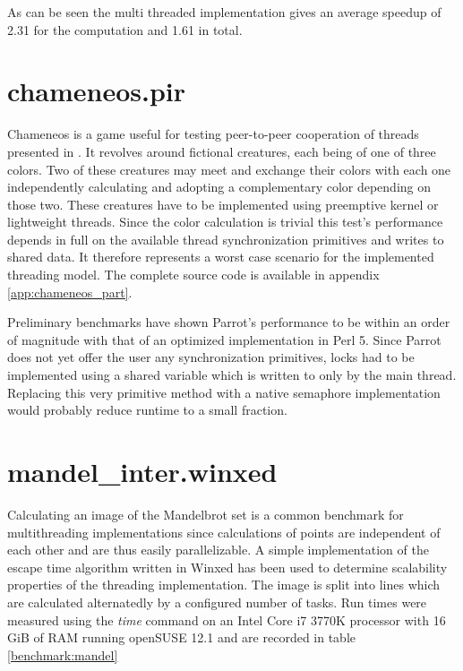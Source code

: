\documentclass[bachelor,english]{hgbthesis}
\begin{document}
As can be seen the multi threaded implementation gives an average speedup of 2.31 for the computation and 1.61 in total.

\section{chameneos.pir}

Chameneos is a game useful for testing peer-to-peer cooperation of threads presented in \cite{Chameneos}. It revolves around fictional creatures, each being of one of three colors. Two of these creatures may meet and exchange their colors with each one independently calculating and adopting a complementary color depending on those two. These creatures have to be implemented using preemptive kernel or lightweight threads. Since the color calculation is trivial this test's performance depends in full on the available thread synchronization primitives and writes to shared data. It therefore represents a worst case scenario for the implemented threading model. The complete source code is available in appendix \ref{app:chameneos_part}.

Preliminary benchmarks have shown Parrot's performance to be within an order of magnitude with that of an optimized implementation in Perl 5. Since Parrot does not yet offer the user any synchronization primitives, locks had to be implemented using a shared variable which is written to only by the main thread. Replacing this very primitive method with a native semaphore implementation would probably reduce runtime to a small fraction.

\section{mandel\_inter.winxed}

Calculating an image of the Mandelbrot set is a common benchmark for multithreading implementations since calculations of points are independent of each other and are thus easily parallelizable. A simple implementation of the escape time algorithm written in Winxed has been used to determine scalability properties of the threading implementation. The image is split into lines which are calculated alternatedly by a configured number of tasks. Run times were measured using the \textit{time} command on an Intel Core i7 3770K processor with 16 GiB of RAM running openSUSE 12.1 and are recorded in table \ref{benchmark:mandel}
\end{document}
